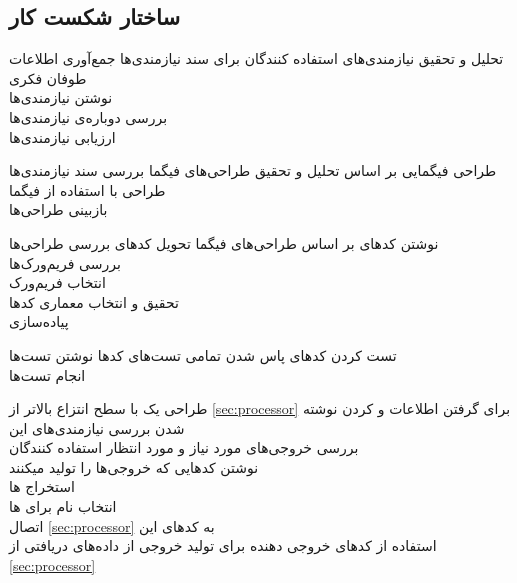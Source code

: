 \subsection{ساختار شکست کار}
\begin{wbsbox}{}
\begin{wbssub}
{تحلیل و تحقیق نیازمندی‌های استفاده کنندگان  برای }
{سند نیازمندی‌ها}
\task
جمع‌آوری اطلاعات \\
\task 
طوفان فکری \\
\task 
نوشتن نیازمندی‌ها \\
\task
بررسی دوباره‌ی نیازمندی‌ها \\
\task 
ارزیابی نیازمندی‌ها
\end{wbssub}

\begin{wbssub}
{طراحی فیگمایی  بر اساس تحلیل و تحقیق }
{طراحی‌های فیگما}
\task 
بررسی سند نیازمندی‌‌ها \\
\task 
طراحی با استفاده از فیگما \\
\task 
بازبینی طراحی‌ها
\end{wbssub}

\begin{wbssub}
{نوشتن کد‌‌های  بر اساس طراحی‌های فیگما}
{تحویل کد‌های }
\task 
بررسی طراحی‌ها \\
\task 
بررسی فریم‌ورک‌‌ها \\
\task 
انتخاب فریم‌ورک \\
\task 
تحقیق و انتخاب معماری کد‌ها \\
\task 
پیاده‌سازی
\end{wbssub}

\begin{wbssub}
{تست کردن کد‌های }
{پاس شدن تمامی تست‌های کد‌ها}
\task 
نوشتن تست‌ها \\
\task
انجام تست‌ها
\end{wbssub}

\begin{wbssub}
{طراحی یک  با سطح انتزاع بالاتر از \ref{sec:processor} برای گرفتن اطلاعات و  کردن}
{نوشته شدن }
\task
بررسی نیازمندی‌های این  \\
\task
بررسی خروجی‌های مورد نیاز و مورد انتظار استفاده کنندگان \\
\task
نوشتن کد‌هایی که خروجی‌ها را تولید میکنند \\
\task
استخراج ها \\
\task 
انتخاب نام برای ها \\
\task
اتصال 
\ref{sec:processor}
به کد‌های این  \\
\task
استفاده از کد‌‌های خروجی دهنده برای تولید خروجی از داده‌های دریافتی از 
\ref{sec:processor}
\end{wbssub}


\end{wbsbox}
